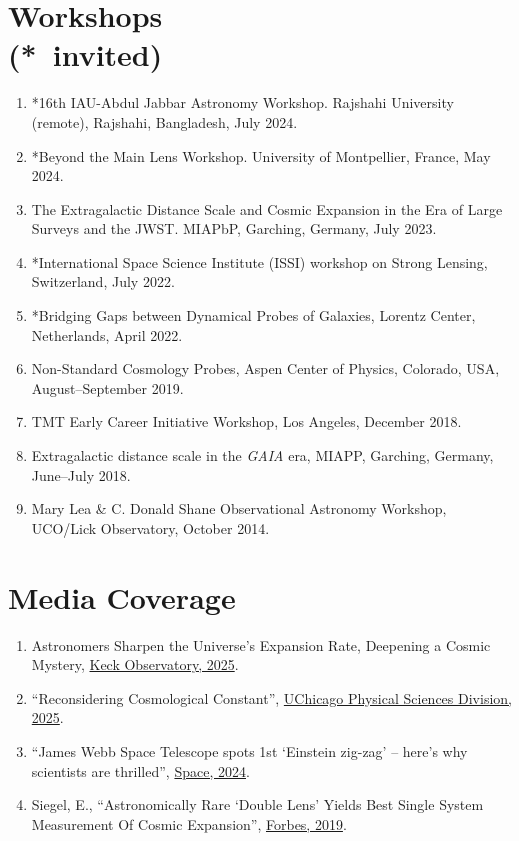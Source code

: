 \documentclass[margin, line]{res}
\begin{document}
\begin{resume}
\section{\sc Workshops \\ ({*}\ invited)}
\begin{enumerate}
	\item *16th IAU-Abdul Jabbar Astronomy Workshop. Rajshahi University (remote), Rajshahi, Bangladesh, July 2024.
	\item *Beyond the Main Lens Workshop. University of Montpellier, France, May 2024.
	\item The Extragalactic Distance Scale and Cosmic Expansion in the Era of Large Surveys and the JWST. MIAPbP, Garching, Germany, July 2023.
	\item *International Space Science Institute (ISSI) workshop on Strong Lensing, Switzerland, July 2022.
	\item *Bridging Gaps between Dynamical Probes of Galaxies, Lorentz Center, Netherlands, April 2022.
	\item Non-Standard Cosmology Probes, Aspen Center of Physics, Colorado, USA, August--September 2019.
	\item TMT Early Career Initiative Workshop, Los Angeles, December 2018.
	\item Extragalactic distance scale in the \textit{GAIA} era, MIAPP, Garching, Germany, June--July 2018.
	\item Mary Lea \& C. Donald Shane Observational Astronomy Workshop, UCO/Lick Observatory, October 2014.
\end{enumerate}


\section{\sc Media Coverage}
\begin{enumerate}
	\item Astronomers Sharpen the Universe's Expansion Rate, Deepening a Cosmic Mystery, \href{https://keckobservatory.org/hubble-tension/}{Keck Observatory, 2025}.
	\item ``Reconsidering Cosmological Constant'', \href{https://physicalsciences.uchicago.edu/news/article/reconsidering-the-cosmological-constant/}{UChicago Physical Sciences Division, 2025}.
	\item ``James Webb Space Telescope spots 1st `Einstein zig-zag' -- here's why scientists are thrilled'', \href{https://www.space.com/first-einstein-zig-zag-jws}{Space, 2024}.
	\item Siegel, E., ``Astronomically Rare `Double Lens' Yields Best Single System Measurement Of Cosmic Expansion'', \href{https://www.forbes.com/sites/startswithabang/2019/10/28/astronomically-rare-double-lens-yields-best-single-system-measurement-of-cosmic-expansion/#55acbc504373}{Forbes, 2019}.	
\end{enumerate}



\end{resume}
\end{document}
